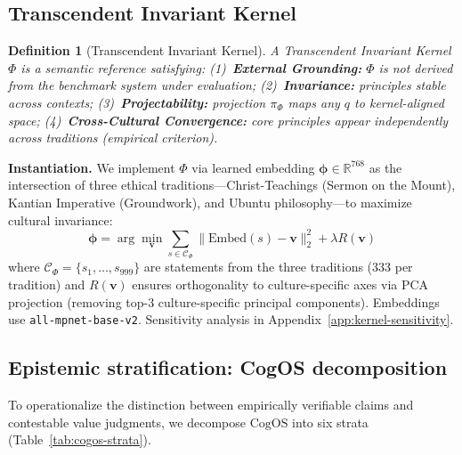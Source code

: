 \documentclass[11pt]{article}
\newtheorem{definition}{Definition}
\newcommand{\CogOS}{\text{CogOS}}
\begin{document}
\subsection{Transcendent Invariant Kernel}

\begin{definition}[Transcendent Invariant Kernel]
\label{def:tik}
A Transcendent Invariant Kernel $\Phi$ is a semantic reference satisfying: (1)~\textbf{External Grounding:} $\Phi$ is not derived from the benchmark system under evaluation; (2)~\textbf{Invariance:} principles stable across contexts; (3)~\textbf{Projectability:} projection $\pi_\Phi$ maps any $q$ to kernel-aligned space; (4)~\textbf{Cross-Cultural Convergence:} core principles appear independently across traditions (empirical criterion).
\end{definition}

\textbf{Instantiation.} We implement $\Phi$ via learned embedding $\boldsymbol{\phi} \in \mathbb{R}^{768}$ as the intersection of three ethical traditions---Christ-Teachings (Sermon on the Mount), Kantian Imperative (Groundwork), and Ubuntu philosophy---to maximize cultural invariance:
\begin{equation}
\boldsymbol{\phi} = \arg\min_{\mathbf{v}} \sum_{s \in \mathcal{C}_\Phi} \|\text{Embed}(s) - \mathbf{v}\|_2^2 + \lambda R(\mathbf{v})
\label{eq:kernel-opt}
\end{equation}
where $\mathcal{C}_\Phi = \{s_1, \ldots, s_{999}\}$ are statements from the three traditions (333 per tradition) and $R(\mathbf{v})$ ensures orthogonality to culture-specific axes via PCA projection (removing top-3 culture-specific principal components). Embeddings use \texttt{all-mpnet-base-v2}. Sensitivity analysis in Appendix~\ref{app:kernel-sensitivity}.


\subsection{Epistemic stratification: CogOS decomposition}

To operationalize the distinction between empirically verifiable claims and contestable value judgments, we decompose $\CogOS$ into six strata (Table~\ref{tab:cogos-strata}).
\end{document}

